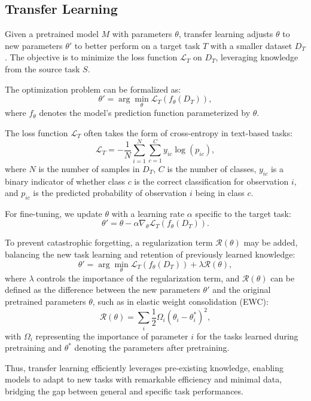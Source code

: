 \documentclass[11pt,a4paper,oneside]{report}
\begin{document}
\subsection{Transfer Learning}
Given a pretrained model \(M\) with parameters \(\theta\), transfer learning \cite{torrey2010transfer} adjusts \(\theta\) to new parameters \(\theta'\) to better perform on a target task \(T\) with a smaller dataset \(D_{T}\). The objective is to minimize the loss function \(\mathcal{L}_{T}\) on \(D_{T}\), leveraging knowledge from the source task \(S\).

The optimization problem can be formalized as:
\[
\theta' = \arg\min_{\theta} \mathcal{L}_{T}(f_{\theta}(D_{T})),
\]
where \(f_{\theta}\) denotes the model's prediction function parameterized by \(\theta\).

The loss function \(\mathcal{L}_{T}\) often takes the form of cross-entropy in text-based tasks:
\[
\mathcal{L}_{T} = -\frac{1}{N}\sum_{i=1}^{N}\sum_{c=1}^{C} y_{ic}\log(p_{ic}),
\]
where \(N\) is the number of samples in \(D_{T}\), \(C\) is the number of classes, \(y_{ic}\) is a binary indicator of whether class \(c\) is the correct classification for observation \(i\), and \(p_{ic}\) is the predicted probability of observation \(i\) being in class \(c\).

For fine-tuning, we update \(\theta\) with a learning rate \(\alpha\) specific to the target task:
\[
\theta' = \theta - \alpha \nabla_{\theta} \mathcal{L}_{T}(f_{\theta}(D_{T})).
\]

To prevent catastrophic forgetting, a regularization term \(\mathcal{R}(\theta)\) may be added, balancing the new task learning and retention of previously learned knowledge:
\[
\theta' = \arg\min_{\theta} \mathcal{L}_{T}(f_{\theta}(D_{T})) + \lambda \mathcal{R}(\theta),
\]
where \(\lambda\) controls the importance of the regularization term, and \(\mathcal{R}(\theta)\) can be defined as the difference between the new parameters \(\theta'\) and the original pretrained parameters \(\theta\), such as in elastic weight consolidation (EWC):
\[
\mathcal{R}(\theta) = \sum_{i} \frac{1}{2} \Omega_{i} (\theta_{i} - \theta_{i}^{*})^2,
\]
with \(\Omega_{i}\) representing the importance of parameter \(i\) for the tasks learned during pretraining and \(\theta^{*}\) denoting the parameters after pretraining.

Thus, transfer learning efficiently leverages pre-existing knowledge, enabling models to adapt to new tasks with remarkable efficiency and minimal data, bridging the gap between general and specific task performances.
\end{document}
